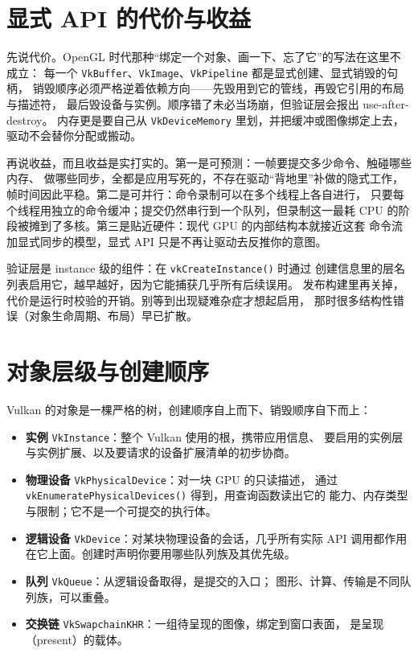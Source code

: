 \documentclass[12pt,a4paper,fontset=fandol]{ctexbook}
\newcommand{\Fn}[1]{\texttt{#1()}}
\newcommand{\Tp}[1]{\texttt{#1}}
\newcommand{\Bk}{\discretionary{}{}{}}
\newcommand{\Lang}[1]{\textsf{#1}}
\newcommand{\DomCPU}{\Lang{CPU}}
\newcommand{\DomGPU}{\Lang{GPU}}
\begin{document}
\section{显式 API 的代价与收益}

先说代价。OpenGL 时代那种``绑定一个对象、画一下、忘了它''的写法在这里不成立：
每一个 \Tp{VkBuffer}、\Tp{VkImage}、\Tp{VkPipeline} 都是显式创建、显式销毁的句柄，
销毁顺序必须严格逆着依赖方向——先毁用到它的管线，再毁它引用的布局与描述符，
最后毁设备与实例。顺序错了未必当场崩，但验证层会报出 use-after-destroy。
内存更是要自己从 \Tp{VkDevice\Bk Memory} 里划，并把缓冲或图像绑定上去，
驱动不会替你分配或搬动。

再说收益，而且收益是实打实的。第一是可预测：一帧要提交多少命令、触碰哪些内存、
做哪些同步，全都是应用写死的，不存在驱动``背地里''补做的隐式工作，
帧时间因此平稳。第二是可并行：命令录制可以在多个线程上各自进行，
只要每个线程用独立的命令缓冲；提交仍然串行到一个队列，但录制这一最耗 \DomCPU{}
的阶段被摊到了多核。第三是贴近硬件：现代 \DomGPU{} 的内部结构本就接近这套
命令流加显式同步的模型，显式 API 只是不再让驱动去反推你的意图。

\begin{note}[title={验证层在 instance 阶段就该挂上}]
验证层是 instance 级的组件：在 \Fn{vkCreate\Bk Instance} 时通过
创建信息里的层名列表启用它，越早越好，因为它能捕获几乎所有后续误用。
发布构建里再关掉，代价是运行时校验的开销。别等到出现疑难杂症才想起启用，
那时很多结构性错误（对象生命周期、布局）早已扩散。
\end{note}

\section{对象层级与创建顺序}

Vulkan 的对象是一棵严格的树，创建顺序自上而下、销毁顺序自下而上：

\begin{itemize}
  \item \textbf{实例} \Tp{VkInstance}：整个 Vulkan 使用的根，携带应用信息、
        要启用的实例层与实例扩展、以及要请求的设备扩展清单的初步协商。
  \item \textbf{物理设备} \Tp{VkPhysical\Bk Device}：对一块 \DomGPU{} 的只读描述，
        通过 \Fn{vkEnumerate\Bk Physical\Bk Devices} 得到，用查询函数读出它的
        能力、内存类型与限制；它不是一个可提交的执行体。
  \item \textbf{逻辑设备} \Tp{VkDevice}：对某块物理设备的会话，几乎所有实际
        API 调用都作用在它上面。创建时声明你要用哪些队列族及其优先级。
  \item \textbf{队列} \Tp{VkQueue}：从逻辑设备取得，是提交的入口；
        图形、计算、传输是不同队列族，可以重叠。
  \item \textbf{交换链} \Tp{VkSwapchain\Bk KHR}：一组待呈现的图像，绑定到窗口表面，
        是呈现（present）的载体。
\end{itemize}
\end{document}

